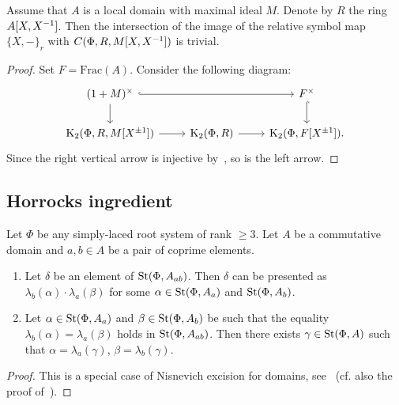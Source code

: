\begin{lemma}\label{lem:symbols}
Assume that $A$ is a local domain with maximal ideal $M$.
Denote by $R$ the ring $A[X, X^{-1}]$.
Then the intersection of the image of the relative symbol map $\{X, -\}_r$ with $C(\Phi, R, M[X, X^{-1}])$ is trivial.
\end{lemma}
\begin{proof}
Set $F = \mathrm{Frac}(A)$.
Consider the following diagram:
\[\begin{tikzcd}
 (1+M)^\times \ar[hookrightarrow, rr] \ar[d] &  & F^\times \ar[hookrightarrow, d] \\
  \K_2(\Phi ,R, M[X^{\pm 1}]) \ar[r] & \K_2(\Phi, R) \ar[r] & \K_2(\Phi, F[X^{\pm 1}]).
\end{tikzcd}\]
Since the right vertical arrow is injective by~\cite[Lemma~2.2]{LS20}, so is the left arrow.
\end{proof}

\subsection{Horrocks ingredient}\label{subsec:horrocks-ingredient}
\begin{lemma} \label{lem:zariski-glueing}
Let $\Phi$ be any simply-laced root system of rank $\geq 3$.
Let $A$ be a commutative domain and $a, b \in A$ be a pair of coprime elements.
\begin{enumerate}
    \item Let $\delta$ be an element of $\operatorname{St}(\Phi, A_{ab})$.
    Then $\delta$ can be presented as $\lambda_b(\alpha) \cdot \lambda_a(\beta)$ for some
    $\alpha \in \operatorname{St}(\Phi, A_a)$ and \beta \in $\operatorname{St}(\Phi, A_b)$.
    \item  Let $\alpha \in \operatorname{St}(\Phi, A_a)$ and $\beta \in \operatorname{St}(\Phi, A_b)$ be such that the equality $\lambda_b(\alpha) = \lambda_a(\beta)$ holds in $\operatorname{St}(\Phi, A_{ab})$.
    Then there exists $\gamma \in \operatorname{St}(\Phi, A)$ such that $\alpha = \lambda_a(\gamma)$, $\beta = \lambda_b(\gamma)$.
\end{enumerate}

\end{lemma}
\begin{proof}
    This is a special case of Nisnevich excision for domains, see~\cite[Proposition~4.5]{LSV2}
    (cf. also the proof of~\cite[Lemma~2.6]{LSV2}).
\end{proof}

